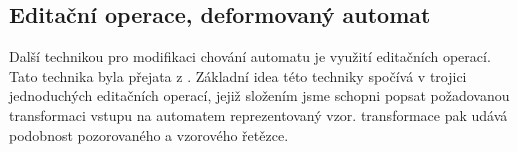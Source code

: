 \documentclass[a4paper,10pt]{article}
\begin{document}
% 
% 
% 
% 
% 
%  
% 

\subsection{Editační operace, deformovaný automat}
Další technikou pro modifikaci chování automatu je využití editačních operací. Tato technika byla přejata z \cite{AstGonMenGar-FuzzAutEpsMovCmpFuzzMeasBtwStrs}. Základní idea této techniky spočívá v trojici jednoduchých editačních operací, jejiž složením jsme schopni popsat požadovanou transformaci vstupu na automatem reprezentovaný vzor.  transformace pak udává podobnost pozorovaného a vzorového řetězce.
\end{document}
